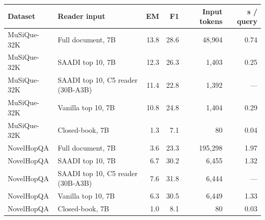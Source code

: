 \begin{tabular}{llrrrr}
\toprule
Dataset & Reader input & EM & F1 & Input tokens & s / query \\
\midrule
MuSiQue-32K & Full document, 7B & 13.8 & 28.6 & 48,904 & 0.74 \\
MuSiQue-32K & SAADI top 10, 7B & 12.3 & 26.3 & 1,403 & 0.25 \\
MuSiQue-32K & SAADI top 10, C5 reader (30B-A3B) & 11.4 & 22.8 & 1,392 & — \\
MuSiQue-32K & Vanilla top 10, 7B & 10.8 & 24.8 & 1,404 & 0.29 \\
MuSiQue-32K & Closed-book, 7B & 1.3 & 7.1 & 80 & 0.04 \\
NovelHopQA & Full document, 7B & 3.6 & 23.3 & 195,298 & 1.97 \\
NovelHopQA & SAADI top 10, 7B & 6.7 & 30.2 & 6,455 & 1.32 \\
NovelHopQA & SAADI top 10, C5 reader (30B-A3B) & 7.6 & 31.8 & 6,444 & — \\
NovelHopQA & Vanilla top 10, 7B & 6.3 & 30.5 & 6,449 & 1.33 \\
NovelHopQA & Closed-book, 7B & 1.0 & 8.1 & 80 & 0.03 \\
\bottomrule
\end{tabular}
